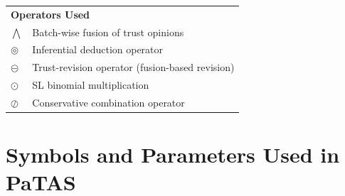 \begin{table}[H]
\begin{tabular}{ll}
\multicolumn{2}{l}{\textbf{Operators Used}} \\
$\bigwedge$ & Batch-wise fusion of trust opinions \\
$\circledcirc$ & Inferential deduction operator \\
$\circleddash$ & Trust-revision operator (fusion-based revision)\\
$\odot$ & SL binomial multiplication \\
$\oslash$ & Conservative combination operator \\
\hline
\end{tabular}
\end{table}


\section{Symbols and Parameters Used in PaTAS}\label{app:symbols}
